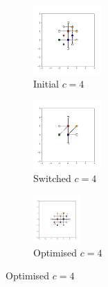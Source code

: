 \begin{figure}[bt]
     \vspace{5mm}
     \begin{subfigure}[b]{0.25\textwidth}
         \centering
         \includegraphics[height=2.6cm]{./figures/general_networks/bs_move_d.pdf}
         \caption{Initial $c=4$}
         \label{fig:bsmoved}
     \end{subfigure}
     \hfill
     \begin{subfigure}[b]{0.25\textwidth}
         \centering
         \includegraphics[height=2.6cm]{./figures/general_networks/bs_move_e.pdf}
         \caption{Switched $c=4$}
         \label{fig:bsmovee}
     \end{subfigure}
     \hfill
     \begin{subfigure}[b]{0.25\textwidth}
         \centering
         \includegraphics[height=1.8cm]{./figures/general_networks/bs_move_f.pdf}
         \caption{Optimised $c=4$}
         \label{fig:bsmovef}
     \end{subfigure}
     

\end{figure}
